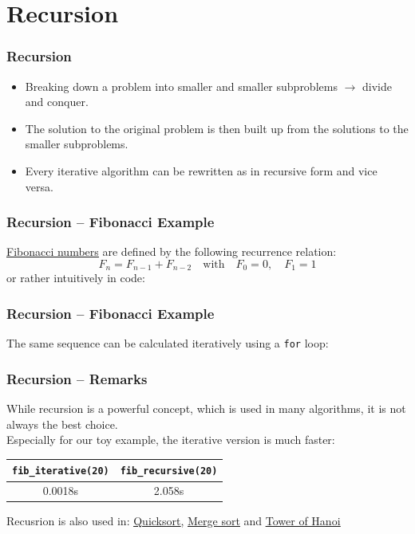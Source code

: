 \documentclass{beamer}
\newcommand{\hrefu}[2]{\underline{\href{#1}{#2}}}
\begin{document}
\section{Recursion}
\begin{frame}
  \frametitle{Recursion}
  \begin{itemize}
    \item Breaking down a problem into smaller and smaller subproblems $\rightarrow$ divide and conquer. 
    \item The solution to the original problem is then built up from the solutions to the smaller subproblems.
    \item Every iterative algorithm can be rewritten as in recursive form and vice versa. 
  \end{itemize}
\end{frame}
\begin{frame}
  \frametitle{Recursion -- Fibonacci Example}
  \hrefu{https://en.wikipedia.org/wiki/Fibonacci\_sequence}{Fibonacci numbers} are defined by the following recurrence relation:
  \begin{equation}
    F_n = F_{n-1} + F_{n-2} \quad \text{with} \quad F_0 = 0, \quad F_1 = 1
  \end{equation}
  or rather intuitively in code: 
  
\end{frame}
\begin{frame}
  \frametitle{Recursion -- Fibonacci Example}
  The same sequence can be calculated iteratively using a \texttt{for} loop:\\
  
\end{frame}
\begin{frame}
  \frametitle{Recursion -- Remarks}
  While recursion is a powerful concept, which is used in many algorithms, it is not always the best choice.\\
  Especially for our toy example, the iterative version is much faster: \\
  \begin{table}
    \centering
    \begin{tabular}{c|c}
      \texttt{fib\_iterative(20)}&\texttt{fib\_recursive(20)} \\
      \hline
      0.0018s&2.058s
    \end{tabular}
  \end{table}
Recusrion is also used in: \hrefu{https://de.wikipedia.org/wiki/Quicksort}{Quicksort}, \hrefu{https://en.wikipedia.org/wiki/Merge_sort}{Merge sort} and \hrefu{https://en.wikipedia.org/wiki/Tower\_of\_Hanoi}{Tower of Hanoi}
\end{frame}
\end{document}
